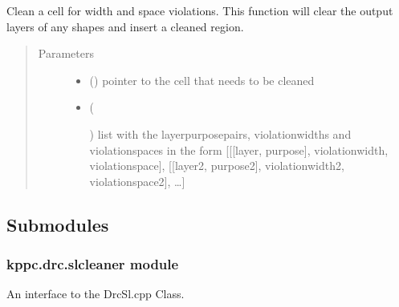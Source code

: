 \documentclass[a4paper,10pt,english]{sphinxmanual}
\begin{document}
\begin{fulllineitems}
\label{\detokenize{drc:kppc.drc.clean}}
Clean a cell for width and space violations.
This function will clear the output layers of any shapes and insert a cleaned region.
\begin{quote}\begin{description}
\item[{Parameters}] \leavevmode\begin{itemize}
\item {} 
 () \textendash{} pointer to the cell that needs to be cleaned

\item {} 
 (%
\begin{footnote}[5]\sphinxAtStartFootnote
{}
%
\end{footnote}) \textendash{} list with the layerpurposepairs, violationwidths and violationspaces in the form {[}{[}{[}layer,
purpose{]}, violationwidth, violationspace{]}, {[}{[}layer2, purpose2{]}, violationwidth2, violationspace2{]}, …{]}

\end{itemize}

\end{description}\end{quote}

\end{fulllineitems}



\subsection{Submodules}
\label{\detokenize{drc:submodules}}

\subsubsection{kppc.drc.slcleaner module}
\label{\detokenize{drc:kppc-drc-slcleaner-module}}\label{\detokenize{drc:slcleaner}}
An interface to the DrcSl.cpp Class.
\end{document}
